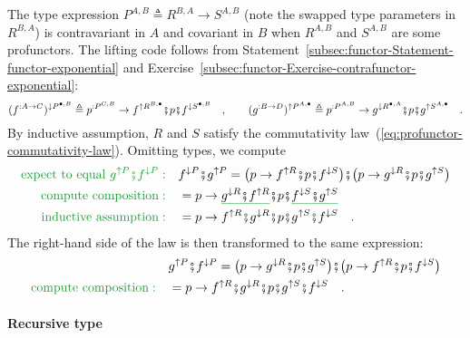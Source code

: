The type expression $P^{A,B}\triangleq R^{B,A}\rightarrow S^{A,B}$
(note the swapped type parameters in $R^{B,A}$) is contravariant
in $A$ and covariant in $B$ when $R^{A,B}$ and $S^{A,B}$ are some
profunctors. The lifting code follows from Statement~\ref{subsec:functor-Statement-functor-exponential}
and Exercise~\ref{subsec:functor-Exercise-contrafunctor-exponential}:
\[
(f^{:A\rightarrow C})^{\downarrow P^{\bullet,B}}\triangleq p^{:P^{C,B}}\rightarrow f^{\uparrow R^{B,\bullet}}\bef p\bef f^{\downarrow S^{\bullet,B}}\quad,\quad\quad(g^{:B\rightarrow D})^{\uparrow P^{A,\bullet}}\triangleq p^{:P^{A,B}}\rightarrow g^{\downarrow R^{\bullet,A}}\bef p\bef g^{\uparrow S^{A,\bullet}}\quad.
\]
By inductive assumption, $R$ and $S$ satisfy the commutativity law~(\ref{eq:profunctor-commutativity-law}).
Omitting types, we compute
\begin{align*}
{\color{greenunder}\text{expect to equal }g^{\uparrow P}\bef f^{\downarrow P}:}\quad & f^{\downarrow P}\bef g^{\uparrow P}=\big(p\rightarrow f^{\uparrow R}\bef p\bef f^{\downarrow S}\big)\bef\big(p\rightarrow g^{\downarrow R}\bef p\bef g^{\uparrow S}\big)\\
{\color{greenunder}\text{compute composition}:}\quad & =p\rightarrow\gunderline{g^{\downarrow R}\bef f^{\uparrow R}}\bef p\bef\gunderline{f^{\downarrow S}\bef g^{\uparrow S}}\\
{\color{greenunder}\text{inductive assumption}:}\quad & =p\rightarrow f^{\uparrow R}\bef g^{\downarrow R}\bef p\bef g^{\uparrow S}\bef f^{\downarrow S}\quad.
\end{align*}
The right-hand side of the law is then transformed to the same expression:
\begin{align*}
 & g^{\uparrow P}\bef f^{\downarrow P}=\big(p\rightarrow g^{\downarrow R}\bef p\bef g^{\uparrow S}\big)\bef\big(p\rightarrow f^{\uparrow R}\bef p\bef f^{\downarrow S}\big)\\
{\color{greenunder}\text{compute composition}:}\quad & =p\rightarrow f^{\uparrow R}\bef g^{\downarrow R}\bef p\bef g^{\uparrow S}\bef f^{\downarrow S}\quad.
\end{align*}


\paragraph{Recursive type}

